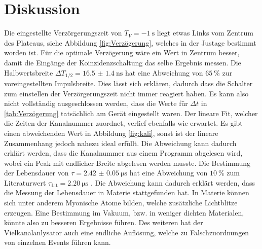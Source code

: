 \section{Diskussion}
Die eingestellte Verzörgerungszeit von $T_V = \SI{-1}{\second}$ liegt etwas Links vom Zentrum des Plateaus, siehe Abbildung \ref{fig:Verzögerung}, welches in der Justage bestimmt worden ist.
Für die optimale Verzögerung wäre ein Wert in Zentrum besser, damit die Eingänge der Koinzidenzschaltung das selbe Ergebnis messen. 
Die Halbwertsbreite $\Delta T_{1/2} = \SI{16.5(14)}{\nano \second}$ hat eine Abweichung von $\SI{65}{\percent} $ zur voreingestellten Impulsbreite. Dies lässt sich erklären, dadurch dass die Schalter zum einstellen der Verzörgerungszeit nicht immer reagiert haben. 
Es kann also nicht vollständig ausgeschlossen werden, dass die Werte für $\Delta t $ in \ref{tab:Verzögerung} tatsächlich am Gerät eingestellt waren.
Der lineare Fit, welcher die Zeiten der Kanalnummer zuordnet, verlief ebenfalls wie erwartet. Es gibt einen 
abweichenden Wert in Abbildung \ref{fig:kali}, sonst ist der lineare Zusammenhang jedoch nahezu ideal erfüllt. 
Die Abweichung kann dadurch erklärt werden, dass die Kanalnummer aus einem Programm abgelesen 
wird, wobei ein Peak mit endlicher Breite abgelesen werden musste. 
Die Bestimmung der Lebensdauer von $\tau = \SI{2.42(5)}{\micro\second}$ hat eine Abweichung von $\SI{10}{\percent}$ zum 
Literaturwert $\tau_{\text{Lit}} = \SI{2.20}{\micro\second}$ \cite{PDG}. Die Abweichung kann 
dadurch erklärt werden, dass die Messung der Lebensdauer in Materie stattgefunden hat. In Materie können 
sich unter anderem Myonische Atome bilden, welche zusätzliche Lichtblitze erzeugen.
Eine Bestimmung im Vakuum, bzw. in weniger dichten Materialen, könnte also zu besseren Ergebnisse 
führen. Des weiteren hat der Vielkanalanlysator auch eine endliche Auflösung, welche zu Falschzuordnungen von einzelnen Events führen kann.

